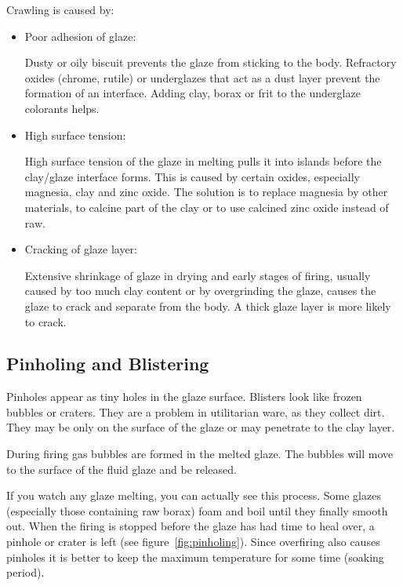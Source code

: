 Crawling is caused by:
\begin{itemize}
\item Poor adhesion of glaze:

Dusty or oily biscuit prevents the glaze from sticking to the body. Refractory 
oxides (chrome, rutile) or underglazes that act as a dust layer prevent the 
formation of an interface. Adding clay, borax or frit to the underglaze 
colorants helps.

\item High surface tension:

High surface tension of the glaze in melting pulls it into islands before the 
clay/glaze interface forms. This is caused by certain oxides, especially 
magnesia, clay and zinc oxide. The solution is to replace magnesia by other 
materials, to calcine part of the clay or to use calcined zinc oxide instead of 
raw.

\item Cracking of glaze layer:

Extensive shrinkage of glaze in drying and early stages of firing, usually 
caused by too much clay content or by overgrinding the glaze, causes the glaze 
to crack and separate from the body. A thick glaze layer is more likely to 
crack.
\end{itemize}
\subsection{Pinholing and Blistering}
Pinholes appear as tiny holes in the glaze surface. Blisters look like frozen 
bubbles or craters. They are a problem in utilitarian ware, as they collect 
dirt. They may be only on the surface of the glaze or may penetrate to the clay 
layer.

During firing gas bubbles are formed in the melted glaze. The bubbles will move 
to the surface of the fluid glaze and be released.

If you watch any glaze melting, you can actually see this process. Some glazes 
(especially those containing raw borax) foam and boil until they finally smooth 
out. When the firing is stopped before the glaze has had time to heal over, a 
pinhole or crater is left (see figure~\ref{fig:pinholing}). Since overfiring 
also causes pinholes it is better to keep the maximum temperature for some time 
(soaking period).

